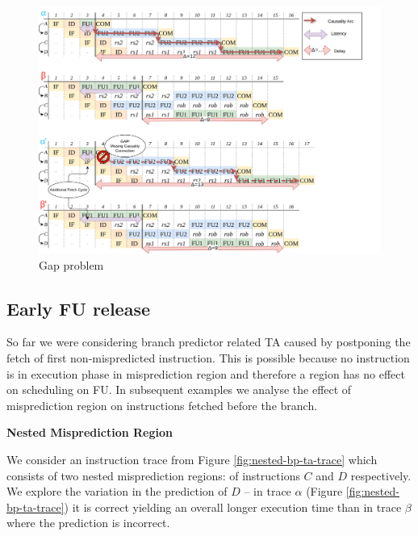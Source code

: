 \begin{figure}[H]
    \centering
    \includegraphics[width=\textwidth]{figures/gap-problem.png}
    \caption{Gap problem}
    \label{fig:gap-problem}
\end{figure}


\subsection{Early FU release}

So far we were considering branch predictor related TA caused by postponing the fetch of first non-mispredicted instruction.  This is possible because no instruction is in execution phase in misprediction region and therefore a region has no effect on scheduling on FU. In subsequent examples we analyse the effect of misprediction region on instructions fetched before the branch.

\begin{example}
\textbf{Nested Misprediction Region}

We consider an instruction trace from Figure \ref{fig:nested-bp-ta-trace} which consists of two nested misprediction regions: of instructions $C$ and $D$ respectively. We explore the variation in the prediction of $D$ -- in trace $\alpha$ (Figure \ref{fig:nested-bp-ta-trace}) it is correct yielding an overall longer execution time than in trace $\beta$ where the prediction is incorrect.
    
\label{ex:nested-bp-ta}
\end{example}


